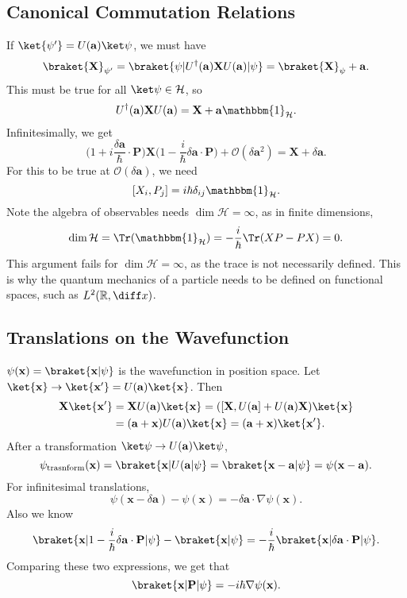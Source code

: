 \documentclass[12pt]{article}
\begin{document}
\subsection{Canonical Commutation Relations}
\label{sub:can_com_rel}

If $\ket{\psi'} = U(\mathbf{a})\ket \psi$, we must have
\[
	\braket{\mathbf{X}}_{\psi'} = \braket{\psi|U^{\dagger}(\mathbf{a})\mathbf{X}U(\mathbf{a})|\psi} = \braket{\mathbf{X}}_\psi + \mathbf{a}.
\]
This must be true for all $\ket \psi \in \mathcal{H}$, so
\[
U^{\dagger}(\mathbf{a})\mathbf{X} U(\mathbf{a}) = \mathbf{X} + \mathbf{a} \mathbbm{1}_{\mathcal{H}}.
\]
Infinitesimally, we get
\[
\biggl(1 + i \frac{\delta \mathbf{a}}{\hbar} \cdot \mathbf{P} \biggr) \mathbf{X} \biggl( 1 - \frac{i}{\hbar} \delta \mathbf{a} \cdot \mathbf{P} \biggr) + \mathcal{O}(\delta \mathbf{a}^2) = \mathbf{X} + \delta \mathbf{a}.
\]
For this to be true at $\mathcal{O}(\delta \mathbf{a})$, we need
\[
	[X_i, P_j] = i \hbar \delta_{ij} \mathbbm{1}_{\mathcal{H}}.
\]
Note the algebra of observables needs $\dim \mathcal{H} = \infty$, as in finite dimensions,
\[
\dim \mathcal{H} = \Tr (\mathbbm{1}_{\mathcal{H}}) = -\frac{i}{\hbar} \Tr(XP - PX) = 0.
\]
This argument fails for $\dim \mathcal{H} = \infty$, as the trace is not necessarily defined. This is why the quantum mechanics of a particle needs to be defined on functional spaces, such as $L^2(\mathbb{R}, \diff x)$.

\subsection{Translations on the Wavefunction}
\label{sub:trans_wave}

$\psi(\mathbf{x}) = \braket{\mathbf{x}|\psi}$ is the wavefunction in position space. Let $\ket{\mathbf{x}} \to \ket{\mathbf{x}'} = U(\mathbf{a})\ket{\mathbf{x}}$. Then
\begin{align*}
	\mathbf{X} \ket{\mathbf{x}'} &= \mathbf{X} U(\mathbf{a})\ket{\mathbf{x}} = ([\mathbf{X},U(\mathbf{a}] + U(\mathbf{a}) \mathbf{X})\ket{\mathbf{x}}\\
				     &= (\mathbf{a} + \mathbf{x})U(\mathbf{a})\ket{\mathbf{x}} = (\mathbf{a} +\mathbf{x}) \ket{\mathbf{x}'}.
\end{align*}
After a transformation $\ket \psi \to U(\mathbf{a})\ket \psi$,
\[
	\psi_{\mathrm{trasnform}}(\mathbf{x})=\braket{\mathbf{x}|U(\mathbf{a}|\psi}=\braket{\mathbf{x}-\mathbf{a}|\psi}=\psi(\mathbf{x}-\mathbf{a}).
\]
For infinitesimal translations,
\[
\psi(\mathbf{x} - \delta \mathbf{a}) - \psi(\mathbf{x}) = - \delta \mathbf{a} \cdot \nabla \psi(\mathbf{x}).
\]
Also we know
\[
	\braket{\mathbf{x} | 1 - \frac{i}{\hbar} \delta \mathbf{a} \cdot \mathbf{P} | \psi} - \braket{\mathbf{x}|\psi} = -\frac{i}{\hbar} \braket{\mathbf{x}|\delta \mathbf{a} \cdot \mathbf{P} | \psi}.
\]
Comparing these two expressions, we get that
\[
	\braket{\mathbf{x}|\mathbf{P}|\psi}= - i \hbar \nabla \psi (\mathbf{x}).
\]
\end{document}
